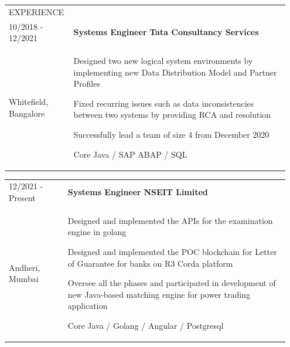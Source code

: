 \documentclass{letter}
\begin{document}
\vspace{15pt}
\begin{tabular}{p{0.2\linewidth} p{0.75\linewidth}}
  \normalsize\colorbox{black!100}{\textcolor{white!90}{EXPERIENCE}} \\[1ex] 
  10/2018 - 12/2021 & \normalsize\textbf{Systems Engineer} \hfill \footnotesize\textbf{Tata Consultancy Services} \\
  \small Whitefield, Bangalore &  
  \raggedright{Designed two new logical system environments by implementing new Data Distribution Model and Partner Profiles} 
  \newline
  \raggedright{Fixed recurring issues such as data inconsistencies between two systems by providing RCA and resolution} 
  \newline
  \raggedright{Successfully lead a team of size 4 from December 2020}
  \newline
  \raggedright{\ttfamily Core Java / SAP ABAP / SQL} \\
\end{tabular}

\begin{tabular}{p{0.2\linewidth} p{0.75\linewidth}}
  12/2021 - Present & \normalsize\textbf{Systems Engineer} \hfill \footnotesize\textbf{NSEIT Limited} \\
  \small Andheri, Mumbai & 
  \raggedright{Designed and implemented the APIs for the examination engine in golang} 
  \newline
  \raggedright{Designed and implemented the POC blockchain for Letter of Guarantee for banks on R3 Corda platform} 
  \newline
  \raggedright{Oversee all the phases and participated in development of new Java-based matching engine for power trading application} 
  \newline
  \raggedright{\ttfamily Core Java / Golang / Angular / Postgresql} \\
\end{tabular}
\end{document}
